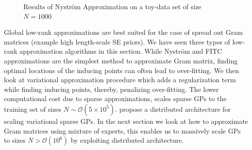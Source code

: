 \begin{figure}[!ht]
  \centering
    \quad
{}\quad
  
       \caption{Results of Nystr\"{o}m Approximation on a toy-data set of size $N=1000$ }\label{figGPPredictionNystorm}
\end{figure}

Global low-rank approximations are best suited for the case of spread out Gram matrices (example high length-scale SE priors). We have seen three types of low-rank approximation algorithms in this section. While Nystr\"{o}m and FITC approximations are the simplest method to approximate Gram matrix, finding optimal locations of the inducing points can often lead to over-fitting. We then look at variational approximation procedure which adds a regularization term while finding inducing points, thereby, penalizing over-fitting. The lower computational cost due to sparse approximations, scales sparse GPs to the training set of sizes $N \sim \mathcal{O}(5 \times 10^5)$. \cite{Gal2014Distributed} propose a distributed architecture for scaling variational sparse GPs. In the next section we look at how to approximate Gram matrices using mixture of experts, this enables us to massively scale GPs to sizes $N > \mathcal{O}(10^6)$ by exploiting distributed architecture.

